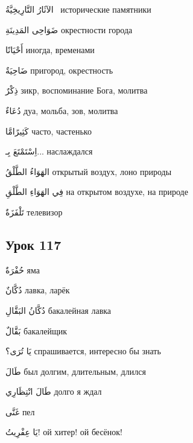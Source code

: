 \documentclass[a5paper]{article}
\newcommand\textstyleDropCaps[1]{#1}
\newcommand\textstyleCaptioncharacters[1]{#1}
\begin{document}
\textstyleCaptioncharacters{الآثَارُ التَّارِيخِيَّةُ \ }\textstyleDropCaps{исто­рические памятники‎}

\textstyleCaptioncharacters{ضَوَاحِى المَدِينَةِ }\textstyleDropCaps{окрестности города ‎}

\textstyleCaptioncharacters{أَحْيَانًا }\textstyleDropCaps{иногда, временами‎}

\textstyleCaptioncharacters{ضَاحِيَةٌ }\textstyleDropCaps{пригород, окрестность‎}

\textstyleCaptioncharacters{ذِكْرٌ }\textstyleDropCaps{зикр, воспоминание Бога, молитва‎}

\textstyleCaptioncharacters{دُعَاءٌ }\textstyleDropCaps{дуа, мольба, зов, мо­литва‎}

\textstyleCaptioncharacters{كَثِيرًامَّا }\textstyleDropCaps{часто, частенько ‎}

\textstyleCaptioncharacters{اِسْتَمْتَعَ بِـ... }\textstyleDropCaps{насла­ждался‎}

\textstyleCaptioncharacters{الهَوَاءُ الطَّلْقُ }\textstyleDropCaps{открытый воздух, лоно природы‎}

\textstyleCaptioncharacters{فِي الهَوَاءِ الطَّلْقِ }\textstyleDropCaps{на открытом воздухе, на природе‎}

\textstyleCaptioncharacters{تَلْفَزَةٌ }\textstyleDropCaps{телевизор‎}

\subsection[Урок 117‎]{\textstyleDropCaps{Урок 117‎}}
\textstyleCaptioncharacters{حُفْرَةٌ }\textstyleDropCaps{яма‎}

\textstyleCaptioncharacters{دُكَّانٌ }\textstyleDropCaps{лавка, ларёк‎}

\textstyleCaptioncharacters{دُكَّانُ البَقَّالِ }\textstyleDropCaps{бакалей­ная лавка‎}

\textstyleCaptioncharacters{بَقَّالٌ }\textstyleDropCaps{бакалейщик‎}

\textstyleCaptioncharacters{يَا تُرَى؟ }\textstyleDropCaps{спрашивается, интересно бы знать‎}

\textstyleCaptioncharacters{طَالَ }\textstyleDropCaps{был долгим, длитель­ным, длился‎}

\textstyleCaptioncharacters{طَالَ انْتِظَارِي }\textstyleDropCaps{долго я ждал‎}

\textstyleCaptioncharacters{غَنَّى }\textstyleDropCaps{пел‎}

\textstyleCaptioncharacters{يَا عِفْرِيتُ! }\textstyleDropCaps{ой хитер! ой бесёнок!‎}
\end{document}
